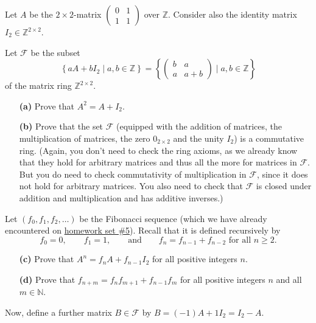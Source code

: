 \documentclass[paper=a4, fontsize=12pt]{scrartcl}%
\theoremstyle{plainsl}
\theoremstyle{definition}
\theoremstyle{remark}
\begin{document}
Let $A$ be the $2 \times2$-matrix $%
\begin{pmatrix}
0 & 1\\
1 & 1
\end{pmatrix}
$ over $\mathbb{Z}$. Consider also the identity matrix $I_{2} \in\mathbb{Z}^{2
\times2}$.

Let $\mathcal{F}$ be the subset
\[
\left\{  aA+bI_{2}\mid a,b\in\mathbb{Z}\right\}  =\left\{
\begin{pmatrix}
b & a\\
a & a+b
\end{pmatrix}
\mid a,b\in\mathbb{Z}\right\}
\]
of the matrix ring $\mathbb{Z}^{2\times2}$.

\begin{enumerate}
\item[\textbf{(a)}] Prove that $A^{2} = A + I_{2}$.

\item[\textbf{(b)}] Prove that the set $\mathcal{F}$ (equipped with the
addition of matrices, the multiplication of matrices, the zero $0_{2 \times2}$
and the unity $I_{2}$) is a commutative ring. \newline(Again, you don't need
to check the ring axioms, as we already know that they hold for arbitrary
matrices and thus all the more for matrices in $\mathcal{F}$. But you do need
to check commutativity of multiplication in $\mathcal{F}$, since it does not
hold for arbitrary matrices. You also need to check that $\mathcal{F}$ is
closed under addition and multiplication and has additive inverses.)
\end{enumerate}

Let $\left(  f_{0},f_{1},f_{2},\ldots\right)  $ be the Fibonacci sequence
(which we have already encountered on
\href{http://www.cip.ifi.lmu.de/~grinberg/t/19s/hw5s.pdf}{homework set \#5}).
Recall that it is defined recursively by
\[
f_{0}=0,\qquad f_{1}=1,\qquad\text{and}\qquad f_{n}=f_{n-1}+f_{n-2}\text{ for
all }n\geq2.
\]


\begin{enumerate}
\item[\textbf{(c)}] Prove that $A^{n} = f_{n} A + f_{n-1} I_{2}$ for all
positive integers $n$.

\item[\textbf{(d)}] Prove that $f_{n+m}=f_{n}f_{m+1}+f_{n-1}f_{m}$ for all
positive integers $n$ and all $m\in\mathbb{N}$.
\end{enumerate}

Now, define a further matrix $B \in\mathcal{F}$ by $B = \left(  -1 \right)  A
+ 1I_{2} = I_{2} - A$.
\end{document}
